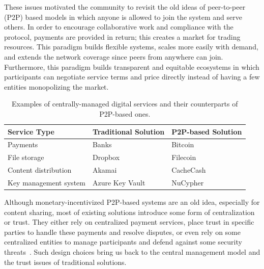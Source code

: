\documentclass{llncs}
\begin{document}
These issues motivated the community to revisit the old ideas of peer-to-peer (P2P) based models in which anyone is allowed to join the system and serve others. In order to encourage collaborative work and compliance with the protocol, payments are provided in return; this creates a market for trading resources. This paradigm builds flexible systems, scales more easily with demand, and extends the network coverage since peers from anywhere can join. Furthermore, this paradigm builds transparent and equitable ecosystems in which participants can negotiate service terms and price directly instead of having a few entities monopolizing the market. 


\begin{table}[t!]
\caption{Examples of centrally-managed digital services and their counterparts of P2P-based ones.} 
\label{service-examples}
\vspace{6 pt}
\centering 
\begin{tabular}{| p{}  | p{} | p{} |}\hline\hline

{\bf Service Type} & {\bf Traditional Solution} & {\bf P2P-based Solution}  \\[0.5ex] \hline \hline
 
Payments & Banks & Bitcoin  \\[0.5ex] \hline

File storage & Dropbox~\cite{dropbox} &  Filecoin~\cite{filecoin}  \\ [0.5ex]  \hline   

Content distribution & Akamai~\cite{akamai} & CacheCash~\cite{almashaqbeh2019cachecash}  \\ [0.5ex]  \hline
    
Key management system & Azure Key Vault~\cite{azure} & NuCypher~\cite{nucypher}  \\ [0.5ex]  \hline    

\end{tabular}
\end{table} 



Although monetary-incentivized P2P-based systems are an old idea, especially for content sharing, most of existing solutions introduce some form of centralization or trust. They either rely on centralized payment services, place trust in specific parties to handle these payments and resolve disputes, or even rely on some centralized entities to manage participants and defend against some security threats~\cite{Kassa13,Nair08,Zhang09}. Such design choices bring us back to the central management model and the trust issues of traditional solutions.
\end{document}
